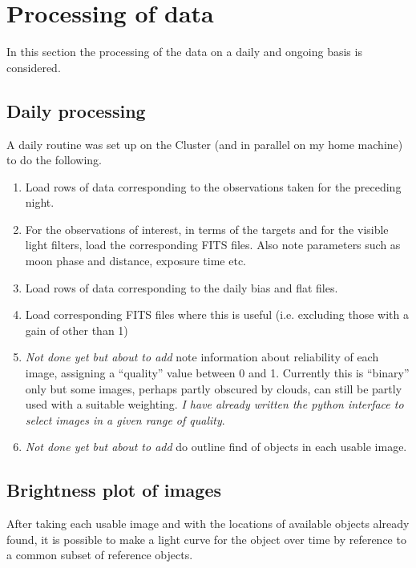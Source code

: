 \section{Processing of data}
\protect\label{section:processing}

In this section the processing of the data on a daily and ongoing basis is
considered.

\subsection{Daily processing}
\protect\label{section:dailyproc}

A daily routine was set up on the Cluster (and in parallel on my home machine)
to do the following.

\begin{enumerate}
  \item Load rows of data corresponding to the observations taken for the
  preceding night.
  \item For the observations of interest, in terms of the targets and for the
  visible light filters, load the corresponding FITS files. Also note parameters
  such as moon phase and distance, exposure time etc.
  \item Load rows of data corresponding to the daily bias and flat files.
  \item Load corresponding FITS files where this is useful (i.e. excluding
  those with a gain of other than 1)
  \item \textit{Not done yet but about to add} note information about
  reliability of each image, assigning a ``quality'' value between 0 and 1.
  Currently this is ``binary'' only but some images, perhaps partly obscured by
  clouds, can still be partly used with a suitable weighting. \textit{I have
  already written the python interface to select images in a given range of
  quality}.
  \item \textit{Not done yet but about to add} do outline find of objects in
  each usable image.
\end{enumerate}

\subsection{Brightness plot of images}
\protect\label{section:recordadus}

After taking each usable image and with the locations of available objects
already found, it is possible to make a light curve for the object over time by
reference to a common subset of reference objects.

